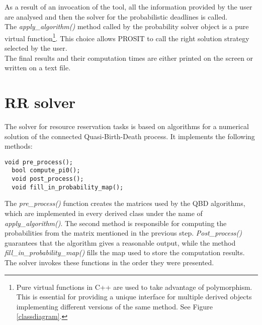 As a result of an invocation of the tool, all the information provided by the user are analysed and then the solver for the probabilistic deadlines is called.\\ 
The \emph{apply\_algorithm()} method called by the probability solver object is a pure virtual function\footnote{Pure virtual functions in C++ are used to take advantage of polymorphism. This is essential for providing a unique interface for multiple derived objects implementing different versions of the same method. See Figure \ref{classdiagram}.}. This choice allows PROSIT to call the right solution strategy selected by the user.\\
The final results and their computation times are either printed on the screen or written on a text file.

\section{RR solver}
The solver for resource reservation tasks is based on algorithms for a numerical solution of the connected Quasi-Birth-Death process. It implements the following methods:
\begin{lstlisting}[frame=bt]
  void pre_process();
  bool compute_pi0();
  void post_process();
  void fill_in_probability_map();
\end{lstlisting}

The \emph{pre\_process()} function creates the matrices used by the QBD algorithms, which are implemented in every derived class under the name of \emph{apply\_algorithm()}. The second method is responsible for computing the probabilities from the matrix mentioned in the previous step. \emph{Post\_process()} guarantees that the algorithm gives a reasonable output, while the method \emph{fill\_in\_probability\_map()} fills the map used to store the computation results.\\
The solver invokes these functions in the order they were presented.

